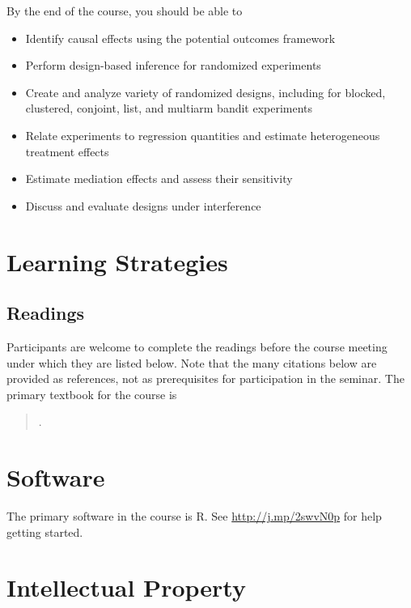 \documentclass[11pt]{article}
\newcommand{\bibverse}[1]{\begin{verse} \bibentry{#1}. \end{verse}}
\begin{document}
By the end of the course, you should be able to

\begin{itemize}
\item Identify causal effects using the potential outcomes framework
\item Perform design-based inference for randomized experiments
\item Create and analyze variety of randomized designs, including for blocked, clustered, conjoint, list, and multiarm bandit experiments
\item Relate experiments to regression quantities and estimate heterogeneous treatment effects
\item Estimate mediation effects and assess their sensitivity
\item Discuss and evaluate designs under interference
\end{itemize}

\section*{Learning Strategies}

\subsection*{Readings}

Participants are welcome to complete the readings before the course meeting under which they are listed below. Note that the many citations below are provided as references, not as prerequisites for participation in the seminar. The primary textbook for the course is

\nobibliography*

\bibverse{gergre12}

\section*{Software}

The primary software in the course is R. See \href{http://www.ryantmoore.org/files/class/introPolResearch/intro_R_short.pdf}{http://j.mp/2swvN0p}
for help getting started.

\section*{Intellectual Property}
\end{document}
